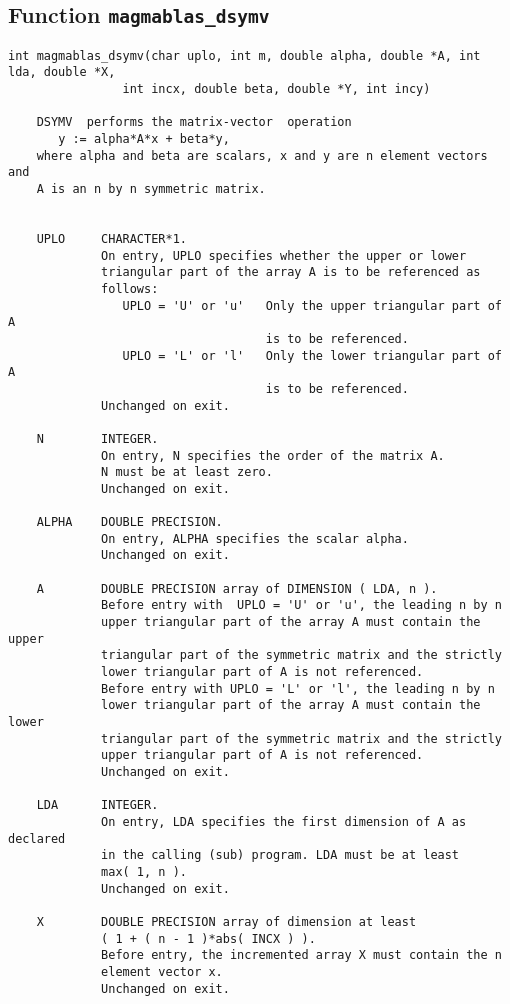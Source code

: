 \documentclass[10pt]{book}
\begin{document}
\subsection{Function {\tt {\bf magmablas\_dsymv}}}
\begin{verbatim}
int magmablas_dsymv(char uplo, int m, double alpha, double *A, int lda, double *X,
                int incx, double beta, double *Y, int incy)

    DSYMV  performs the matrix-vector  operation
       y := alpha*A*x + beta*y,
    where alpha and beta are scalars, x and y are n element vectors and
    A is an n by n symmetric matrix.

 
    UPLO     CHARACTER*1.
             On entry, UPLO specifies whether the upper or lower
             triangular part of the array A is to be referenced as
             follows:
                UPLO = 'U' or 'u'   Only the upper triangular part of A
                                    is to be referenced.
                UPLO = 'L' or 'l'   Only the lower triangular part of A
                                    is to be referenced.
             Unchanged on exit.

    N        INTEGER.
             On entry, N specifies the order of the matrix A.
             N must be at least zero.
             Unchanged on exit.

    ALPHA    DOUBLE PRECISION.
             On entry, ALPHA specifies the scalar alpha.
             Unchanged on exit.

    A        DOUBLE PRECISION array of DIMENSION ( LDA, n ).
             Before entry with  UPLO = 'U' or 'u', the leading n by n
             upper triangular part of the array A must contain the upper
             triangular part of the symmetric matrix and the strictly
             lower triangular part of A is not referenced.
             Before entry with UPLO = 'L' or 'l', the leading n by n
             lower triangular part of the array A must contain the lower
             triangular part of the symmetric matrix and the strictly
             upper triangular part of A is not referenced.
             Unchanged on exit.

    LDA      INTEGER.
             On entry, LDA specifies the first dimension of A as declared
             in the calling (sub) program. LDA must be at least
             max( 1, n ).
             Unchanged on exit.

    X        DOUBLE PRECISION array of dimension at least
             ( 1 + ( n - 1 )*abs( INCX ) ).
             Before entry, the incremented array X must contain the n
             element vector x.
             Unchanged on exit.


\end{verbatim}
\end{document}
